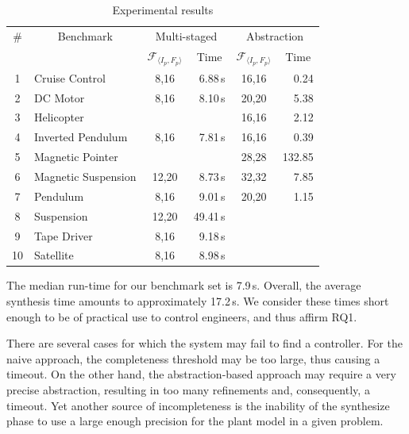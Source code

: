 \documentclass[runningheads,a4paper]{llncs}
\newcommand{\xmark}{\ding{55}}
\begin{document}
\begin{table}
\centering
\begin{tabular}{| c | l | c | r | c | r |}
%
\hline
\# & \multicolumn{1}{|c|}{Benchmark}  & \multicolumn{2}{|c|}{Multi-staged}                 & \multicolumn{2}{|c|}{Abstraction} \\
   &                                  & \multicolumn{1}{|c|}{$\mathcal{F}_{\langle I_p,F_p \rangle}$} & \multicolumn{1}{|c|}{Time} & \multicolumn{1}{|c|}{$\mathcal{F}_{\langle I_p,F_p \rangle}$} & \multicolumn{1}{|c|}{Time} \\\hline
1  & Cruise Control      & 8,16   & 6.88\,s & 16,16  &   0.24 \\
2  & DC Motor            & 8,16   & 8.10\,s & 20,20  &   5.38 \\
3  & Helicopter          & \xmark & \xmark  & 16,16  &   2.12 \\
4  & Inverted Pendulum   & 8,16   & 7.81\,s & 16,16  &   0.39 \\
5  & Magnetic Pointer    & \xmark & \xmark  & 28,28  & 132.85 \\
6  & Magnetic Suspension & 12,20  & 8.73\,s & 32,32  &   7.85 \\
7  & Pendulum            & 8,16   & 9.01\,s & 20,20  &   1.15 \\
8  & Suspension          & 12,20  &49.41\,s & \xmark & \xmark \\
9  & Tape Driver         & 8,16   & 9.18\,s & \xmark & \xmark \\
10 & Satellite           & 8,16   & 8.98\,s & \xmark & \xmark \\\hline
%
\end{tabular}
\caption{Experimental results\label{tab:results}}
\end{table}

The median run-time for our benchmark set is 7.9\,s.  Overall, the average
synthesis time amounts to approximately 17.2\,s.  We consider these times
short enough to be of practical use to control engineers, and thus affirm
RQ1.

There are several cases for which the system may fail to find a controller. 
For the naive approach, the completeness threshold may be too large, thus
causing a timeout.  On the other hand, the abstraction-based approach may
require a very precise abstraction, resulting in too many refinements and,
consequently, a timeout.  Yet another source of incompleteness is the
inability of the {\sc synthesize} phase to use a large enough precision for
the plant model in a given problem.
\end{document}
